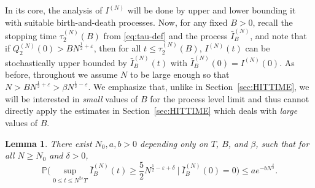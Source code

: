 \documentclass[11pt, reqno]{article}
\newtheorem{lemma}[theorem]{Lemma}
\numberwithin{equation}{section}
\numberwithin{theorem}{section}
\begin{document}
In its core, the analysis of $I^{(N)}$ will be done by upper and lower bounding it with suitable birth-and-death processes. 
Now, for any fixed $B>0$, recall the stopping time $\tau^{(N)}_2(B)$ from \eqref{eq:tau-def} and the process $\bar{I}^{(N)}_B$, and note that
if $Q^{(N)}_2(0)>BN^{\frac{1}{2}+\varepsilon}$, then for all $t\leq \tau^{(N)}_2(B)$, $I^{(N)}(t)$ can be stochastically upper bounded by $\bar{I}^{(N)}_B(t)$ with $\bar{I}^{(N)}_B(0) = I^{(N)}(0)$.
As before, throughout we assume $N$ to be large enough so that $N> BN^{\frac{1}{2}+\varepsilon}>\beta N^{\frac{1}{2}-\varepsilon}$. We emphasize that, unlike in Section~\ref{sec:HITTIME}, we will be interested in \emph{small} values of $B$ for the process level limit and thus cannot directly apply the estimates in Section~\ref{sec:HITTIME} which deals with \emph{large} values of $B$.
\begin{lemma}\label{lem:MM1-IDLE}
There exist $N_0, a, b > 0$ depending only on $T$, $B$, and $\beta$, such that 
for all $N\geq N_0$ and $\delta>0$,
$$\mathbb{P}\Big(\sup_{0\leq t\leq N^{2\varepsilon}T}\bar{I}^{(N)}_B(t)\geq \frac{5}{2} N^{\frac{1}{2}-\varepsilon+\delta}\ \big|\ \bar{I}^{(N)}_B(0)=0\Big)\leq a e^{-bN^{\frac{\delta}{2}}}.$$
\end{lemma}
\end{document}
